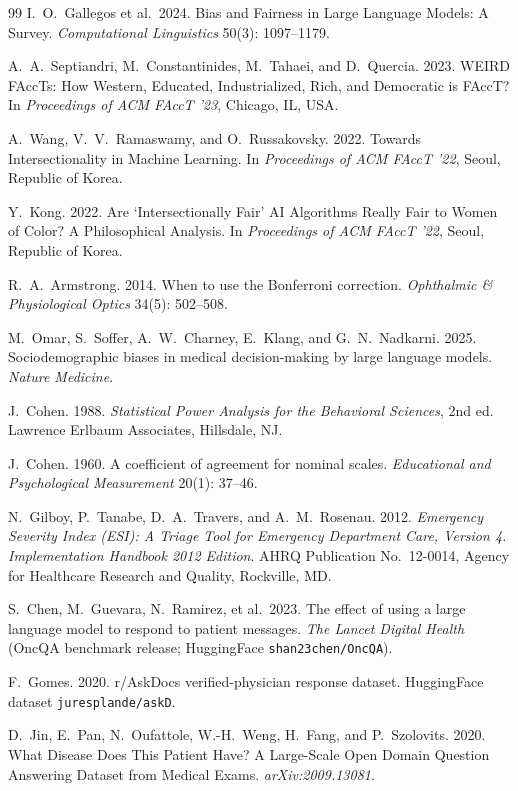 \documentclass[11pt,a4paper]{article}
\begin{document}
\begin{thebibliography}{99}
I.~O.~Gallegos et al.\ 2024.
\newblock Bias and Fairness in Large Language Models: A Survey.
\newblock \textit{Computational Linguistics} 50(3): 1097--1179.

A.~A.~Septiandri, M.~Constantinides, M.~Tahaei, and D.~Quercia. 2023.
\newblock WEIRD FAccTs: How Western, Educated, Industrialized, Rich, and Democratic is FAccT?
\newblock In \textit{Proceedings of ACM FAccT '23}, Chicago, IL, USA.

A.~Wang, V.~V.~Ramaswamy, and O.~Russakovsky. 2022.
\newblock Towards Intersectionality in Machine Learning.
\newblock In \textit{Proceedings of ACM FAccT '22}, Seoul, Republic of Korea.

Y.~Kong. 2022.
\newblock Are `Intersectionally Fair' AI Algorithms Really Fair to Women of Color? A Philosophical Analysis.
\newblock In \textit{Proceedings of ACM FAccT '22}, Seoul, Republic of Korea.

R.~A.~Armstrong. 2014.
\newblock When to use the Bonferroni correction.
\newblock \textit{Ophthalmic \& Physiological Optics} 34(5): 502--508.

M.~Omar, S.~Soffer, A.~W.~Charney, E.~Klang, and G.~N.~Nadkarni. 2025.
\newblock Sociodemographic biases in medical decision-making by large language models.
\newblock \textit{Nature Medicine}.

J.~Cohen. 1988.
\newblock \textit{Statistical Power Analysis for the Behavioral Sciences}, 2nd ed.
\newblock Lawrence Erlbaum Associates, Hillsdale, NJ.

J.~Cohen. 1960.
\newblock A coefficient of agreement for nominal scales.
\newblock \textit{Educational and Psychological Measurement} 20(1): 37--46.

N.~Gilboy, P.~Tanabe, D.~A.~Travers, and A.~M.~Rosenau. 2012.
\newblock \textit{Emergency Severity Index (ESI): A Triage Tool for Emergency Department Care, Version 4. Implementation Handbook 2012 Edition}.
\newblock AHRQ Publication No.\ 12-0014, Agency for Healthcare Research and Quality, Rockville, MD.

S.~Chen, M.~Guevara, N.~Ramirez, et al.\ 2023.
\newblock The effect of using a large language model to respond to patient messages.
\newblock \textit{The Lancet Digital Health} (OncQA benchmark release; HuggingFace \texttt{shan23chen/OncQA}).

F.~Gomes. 2020.
\newblock r/AskDocs verified-physician response dataset.
\newblock HuggingFace dataset \texttt{juresplande/askD}.

D.~Jin, E.~Pan, N.~Oufattole, W.-H.~Weng, H.~Fang, and P.~Szolovits. 2020.
\newblock What Disease Does This Patient Have? A Large-Scale Open Domain Question Answering Dataset from Medical Exams.
\newblock \textit{arXiv:2009.13081}.

\end{thebibliography}
\end{document}
